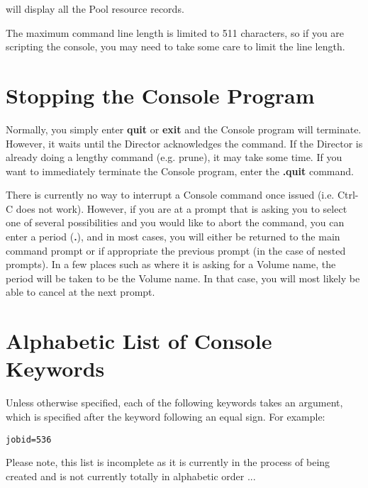 will display all the Pool resource records. 

The maximum command line length is limited to 511 characters, so if you
are scripting the console, you may need to take some care to limit the
line length.

\section{Stopping the Console Program}

Normally, you simply enter {\bf quit} or {\bf exit} and the Console program
will terminate. However, it waits until the Director acknowledges the command.
If the Director is already doing a lengthy command (e.g. prune), it may take
some time. If you want to immediately terminate the Console program, enter the
{\bf .quit} command. 

There is currently no way to interrupt a Console command once issued (i.e.
Ctrl-C does not work). However, if you are at a prompt that is asking you to
select one of several possibilities and you would like to abort the command,
you can enter a period ({\bf .}), and in most cases, you will either be
returned to the main command prompt or if appropriate the previous prompt (in
the case of nested prompts). In a few places such as where it is asking for a
Volume name, the period will be taken to be the Volume name. In that case, you
will most likely be able to cancel at the next prompt. 

\label{keywords}
\section{Alphabetic List of Console Keywords}
Unless otherwise specified, each of the following keywords
takes an argument, which is specified after the keyword following
an equal sign. For example:

\begin{verbatim}
jobid=536
\end{verbatim}

Please note, this list is incomplete as it is currently in
the process of being created and is not currently totally in 
alphabetic
order ...

